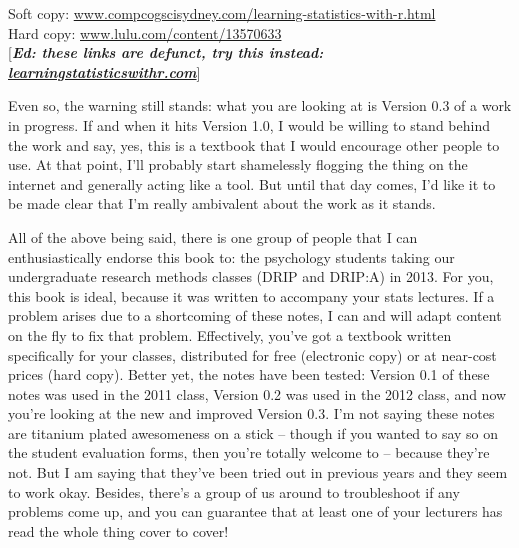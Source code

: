\documentclass[
  letterpaper,
]{book}
\begin{document}
Soft copy:
\href{https://www.compcogscisydney.com/learning-statistics-with-r.html}{www.compcogscisydney.com/learning-statistics-with-r.html}\\
Hard copy:
\href{https://www.lulu.com/content/13570633}{www.lulu.com/content/13570633}\\
{[}\textbf{\emph{Ed: these links are defunct, try this instead:
\href{https://learningstatisticswithr.com}{learningstatisticswithr.com}}}{]}

Even so, the warning still stands: what you are looking at is Version
0.3 of a work in progress. If and when it hits Version 1.0, I would be
willing to stand behind the work and say, yes, this is a textbook that I
would encourage other people to use. At that point, I'll probably start
shamelessly flogging the thing on the internet and generally acting like
a tool. But until that day comes, I'd like it to be made clear that I'm
really ambivalent about the work as it stands.

All of the above being said, there is one group of people that I can
enthusiastically endorse this book to: the psychology students taking
our undergraduate research methods classes (DRIP and DRIP:A) in 2013.
For you, this book is ideal, because it was written to accompany your
stats lectures. If a problem arises due to a shortcoming of these notes,
I can and will adapt content on the fly to fix that problem.
Effectively, you've got a textbook written specifically for your
classes, distributed for free (electronic copy) or at near-cost prices
(hard copy). Better yet, the notes have been tested: Version 0.1 of
these notes was used in the 2011 class, Version 0.2 was used in the 2012
class, and now you're looking at the new and improved Version 0.3. I'm
not saying these notes are titanium plated awesomeness on a stick --
though if you wanted to say so on the student evaluation forms, then
you're totally welcome to -- because they're not. But I am saying that
they've been tried out in previous years and they seem to work okay.
Besides, there's a group of us around to troubleshoot if any problems
come up, and you can guarantee that at least one of your lecturers has
read the whole thing cover to cover!
\end{document}

